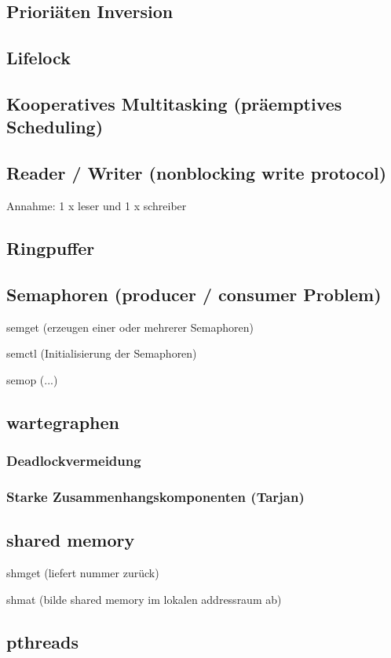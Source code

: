 \subsection{Prioriäten Inversion}

\subsection{Lifelock}

\subsection{Kooperatives Multitasking (präemptives Scheduling)}

\subsection{Reader / Writer (nonblocking write protocol)}
 Annahme: 1 x leser und 1 x schreiber

\subsection{Ringpuffer}

\subsection{Semaphoren (producer / consumer Problem)}

\begin{description}
\item semget (erzeugen einer oder mehrerer Semaphoren)
\item semctl (Initialisierung der Semaphoren)
\item semop (...)
\end{description}
    
\subsection{wartegraphen}

\subsubsection{Deadlockvermeidung}

\subsubsection{Starke Zusammenhangskomponenten (Tarjan)}

\subsection{shared memory}

\begin{description}
\item shmget (liefert nummer zurück)
\item shmat (bilde shared memory im lokalen addressraum ab)
\end{description}

\subsection{pthreads}


